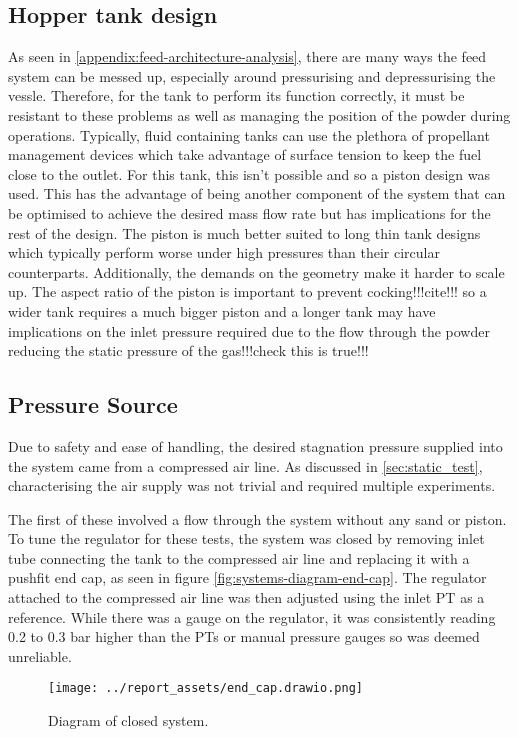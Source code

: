 \subsection{Hopper tank design}
As seen in \autoref{appendix:feed-architecture-analysis}, there are many ways the feed system can be messed up, especially around pressurising and depressurising the vessle. Therefore, for the tank to perform its function correctly, it must be resistant to these problems as well as managing the position of the powder during operations. Typically, fluid containing tanks can use the plethora of propellant management devices which take advantage of surface tension to keep the fuel close to the outlet. For this tank, this isn't possible and so a piston design was used. This has the advantage of being another component of the system that can be optimised to achieve the desired mass flow rate but has implications for the rest of the design. The piston is much better suited to long thin tank designs which typically perform worse under high pressures than their circular counterparts. Additionally, the demands on the geometry make it harder to scale up. The aspect ratio of the piston is important to prevent cocking!!!cite!!! so a wider tank requires a much bigger piston and a longer tank may have implications on the inlet pressure required due to the flow through the powder reducing the static pressure of the gas!!!check this is true!!!

\newpage
\subsection{Pressure Source}
Due to safety and ease of handling, the desired stagnation pressure supplied into the system came from a compressed air line. As discussed in \autoref{sec:static_test}, characterising the air supply was not trivial and required multiple experiments. 

The first of these involved a flow through the system without any sand or piston. To tune the regulator for these tests, the system was closed by removing inlet tube connecting the tank to the compressed air line and replacing it with a pushfit end cap, as seen in figure \autoref{fig:systems-diagram-end-cap}. The regulator attached to the compressed air line was then adjusted using the inlet PT as a reference. While there was a gauge on the regulator, it was consistently reading 0.2 to 0.3 bar higher than the PTs or manual pressure gauges so was deemed unreliable. 
\begin{figure}[htbp]
    \centering
    \begin{minipage}{0.45\textwidth}
        \centering
        \texttt{[image: ../report\_assets/end\_cap.drawio.png]}
        \caption{Diagram of closed system.}\label{fig:systems-diagram-end-cap}
    \end{minipage}
\end{figure}

